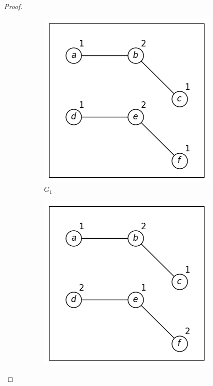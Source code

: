 \documentclass{article}
\begin{document}
\begin{proof}
    \begin{figure}[ht]
        \centering
        \begin{subfigure}[b]{0.25\textwidth}
            \includegraphics[width=\textwidth]{figures/lwl vs wl-ed/G1.png}
            \caption{$G_1$}
        \end{subfigure}
        \begin{subfigure}[b]{0.25\textwidth}
            \includegraphics[width=\textwidth]{figures/lwl vs wl-ed/G2.png}

\end{subfigure}
\end{figure}
\end{proof}
\end{document}
